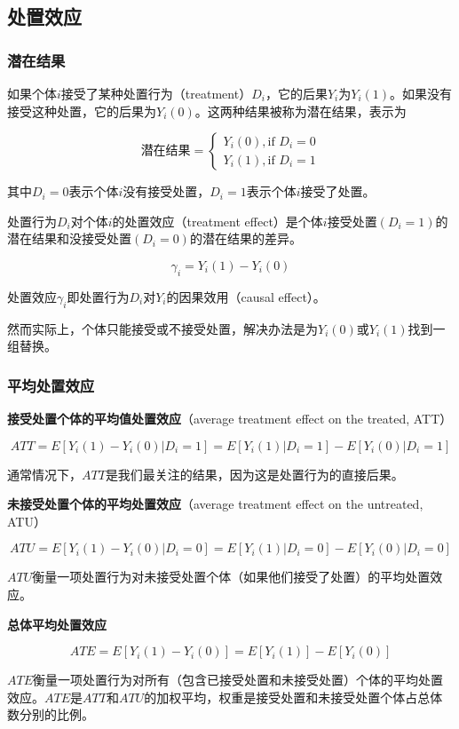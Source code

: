 \documentclass[11pt,a4paper]{ctexart}
\begin{document}
\subsection{处置效应}

\subsubsection{潜在结果}

如果个体\(i\)接受了某种处置行为（treatment）\(D_i\)，它的后果\(Y_i\)为\(Y_i(1)\)。如果没有接受这种处置，它的后果为\(Y_i(0)\)。这两种结果被称为潜在结果，表示为

\[\text{潜在结果}=\begin{cases}
Y_i(0),\text{if }D_i=0\\
Y_i(1),\text{if }D_i=1
\end{cases}\]

其中\(D_i=0\)表示个体\(i\)没有接受处置，\(D_i=1\)表示个体\(i\)接受了处置。

处置行为\(D_i\)对个体\(i\)的处置效应（treatment
effect）是个体\(i\)接受处置\((D_i=1)\)的潜在结果和没接受处置\((D_i=0)\)的潜在结果的差异。

\[\gamma_i=Y_i(1)-Y_i(0)\]

处置效应\(\gamma_i\)即处置行为\(D_i\)对\(Y_i\)的因果效用（causal
effect）。

然而实际上，个体只能接受或不接受处置，解决办法是为\(Y_i(0)\)或\(Y_i(1)\)找到一组替换。

\subsubsection{平均处置效应}

\textbf{接受处置个体的平均值处置效应}（average treatment effect on the
treated, ATT）

\[ATT=E[Y_i(1)-Y_i(0)|D_i=1]=E[Y_i(1)|D_i=1]-E[Y_i(0)|D_i=1]\]

通常情况下，\(ATT\)是我们最关注的结果，因为这是处置行为的直接后果。

\textbf{未接受处置个体的平均处置效应}（average treatment effect on the
untreated, ATU）

\[ATU=E[Y_i(1)-Y_i(0)|D_i=0]=E[Y_i(1)|D_i=0]-E[Y_i(0)|D_i=0]\]

\(ATU\)衡量一项处置行为对未接受处置个体（如果他们接受了处置）的平均处置效应。

\textbf{总体平均处置效应}

\[ATE=E[Y_i(1)-Y_i(0)]=E[Y_i(1)]-E[Y_i(0)]\]

\(ATE\)衡量一项处置行为对所有（包含已接受处置和未接受处置）个体的平均处置效应。\(ATE\)是\(ATT\)和\(ATU\)的加权平均，权重是接受处置和未接受处置个体占总体数分别的比例。
\end{document}
